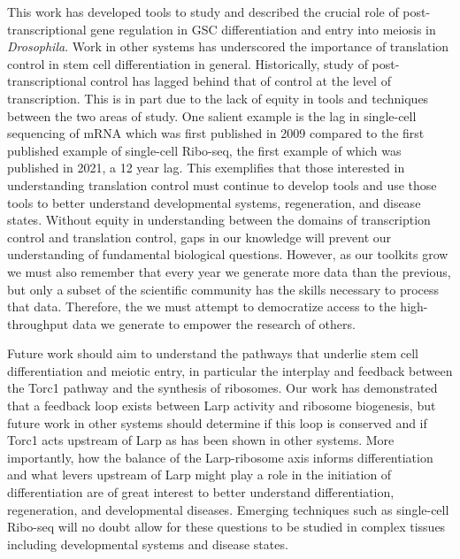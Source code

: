 \documentclass[12pt,oneside]{reedthesis}
\begin{document}
This work has developed tools to study and described the crucial role of post-transcriptional gene regulation in GSC differentiation and entry into meiosis in \emph{Drosophila}. Work in other systems has underscored the importance of translation control in stem cell differentiation in general. Historically, study of post-transcriptional control has lagged behind that of control at the level of transcription. This is in part due to the lack of equity in tools and techniques between the two areas of study. One salient example is the lag in single-cell sequencing of mRNA which was first published in 2009 compared to the first published example of single-cell Ribo-seq, the first example of which was published in 2021, a 12 year lag. This exemplifies that those interested in understanding translation control must continue to develop tools and use those tools to better understand developmental systems, regeneration, and disease states. Without equity in understanding between the domains of transcription control and translation control, gaps in our knowledge will prevent our understanding of fundamental biological questions. However, as our toolkits grow we must also remember that every year we generate more data than the previous, but only a subset of the scientific community has the skills necessary to process that data. Therefore, the we must attempt to democratize access to the high-throughput data we generate to empower the research of others.

Future work should aim to understand the pathways that underlie stem cell differentiation and meiotic entry, in particular the interplay and feedback between the Torc1 pathway and the synthesis of ribosomes. Our work has demonstrated that a feedback loop exists between Larp activity and ribosome biogenesis, but future work in other systems should determine if this loop is conserved and if Torc1 acts upstream of Larp as has been shown in other systems. More importantly, how the balance of the Larp-ribosome axis informs differentiation and what levers upstream of Larp might play a role in the initiation of differentiation are of great interest to better understand differentiation, regeneration, and developmental diseases. Emerging techniques such as single-cell Ribo-seq will no doubt allow for these questions to be studied in complex tissues including developmental systems and disease states.
\end{document}
